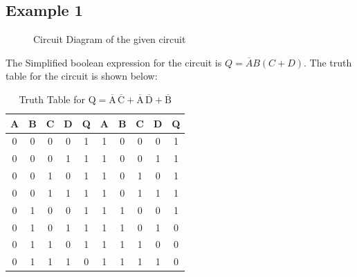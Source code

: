 \documentclass{scrartcl}
\newcommand{\1}{\mathbbm{1}}
\begin{document}
\subsection{Example 1}
\begin{figure}[H]
        \centering
        
        \caption{Circuit Diagram of the given circuit}
\end{figure}
The Simplified boolean expression for the circuit is $Q = \overline{A}B(C+D)$. The truth table for the circuit is shown below:
\begin{table}[H]
    \centering
    \caption{Truth Table for \( \mathrm{Q} = \mathrm{\overline{A}\,\overline{C} + \overline{A}\,\overline{D} + \overline{B}} \)}
    \vspace{0.2cm}
    \begin{tabular}{|c|c|c|c||c|||c|c|c|c||c|}
    \hline
    \textbf{A} & \textbf{B} & \textbf{C} & \textbf{D} & \textbf{Q}& \textbf{A} & \textbf{B} & \textbf{C} & \textbf{D} & \textbf{Q}  \\
    \hline
        0 & 0 & 0 & 0 & 1 & 1 & 0 & 0 & 0 & 1 \\
        0 & 0 & 0 & 1 & 1 & 1 & 0 & 0 & 1 & 1 \\
        0 & 0 & 1 & 0 & 1 & 1 & 0 & 1 & 0 & 1 \\
        0 & 0 & 1 & 1 & 1 & 1 & 0 & 1 & 1 & 1 \\
        0 & 1 & 0 & 0 & 1 & 1 & 1 & 0 & 0 & 1 \\
        0 & 1 & 0 & 1 & 1 & 1 & 1 & 0 & 1 & 0 \\
        0 & 1 & 1 & 0 & 1 & 1 & 1 & 1 & 0 & 0 \\
        0 & 1 & 1 & 1 & 0 & 1 & 1 & 1 & 1 & 0 \\
       \hline           
        \end{tabular}
    \end{table}
\end{document}
